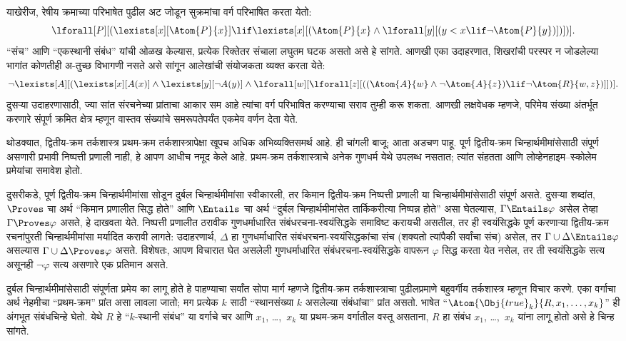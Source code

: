 याखेरीज, रेषीय क्रमाच्या परिभाषेत पुढील अट जोडून सुक्रमांचा वर्ग परिभाषित
करता येतो:
\[\lforall[P][(\lexists[x][\Atom{P}{x}] \lif \lexists[x][(\Atom{P}{x}
    \land \lforall[y][(y < x \lif \lnot \Atom{P}{y})])])].
\]
“संच” आणि “एकस्थानी संबंध” यांची ओळख केल्यास, प्रत्येक रिक्तेतर संचाला
लघुतम घटक असतो असे हे सांगते. आणखी एका उदाहरणात, शिखरांची परस्पर न जोडलेल्या
भागांत कोणतीही अ-तुच्छ विभागणी नसते असे सांगून आलेखांची संयोजकता व्यक्त करता
येते:
\[\lnot \lexists[A][(\lexists[x][A(x)] \land \lexists[y][\lnot A(y)]
  \land \lforall[w][\lforall[z][((\Atom{A}{w} \land \lnot \Atom{A}{z})
      \lif \lnot \Atom{R}{w,z})]])].
\]
दुसऱ्या उदाहरणासाठी, ज्या सांत संरचनेच्या प्रांताचा आकार सम
आहे त्यांचा वर्ग परिभाषित करण्याचा सराव तुम्ही करू शकता. आणखी लक्षवेधक
म्हणजे, परिमेय संख्या अंतर्भूत करणारे संपूर्ण क्रमित क्षेत्र म्हणून वास्तव
संख्यांचे समरूपतेपर्यंत एकमेव वर्णन देता येते.

थोडक्यात, द्वितीय-क्रम तर्कशास्त्र प्रथम-क्रम तर्कशास्त्रापेक्षा खूपच अधिक
अभिव्यक्तिसमर्थ आहे. ही चांगली बाजू; आता अडचण पाहू. पूर्ण द्वितीय-क्रम
चिन्हार्थमीमांसेसाठी संपूर्ण असणारी प्रभावी निष्पत्ती प्रणाली नाही, हे
आपण आधीच नमूद केले आहे. प्रथम-क्रम तर्कशास्त्राचे अनेक गुणधर्म येथे उपलब्ध
नसतात; त्यांत संहतता आणि लोव्हेनहाइम--स्कोलेम प्रमेयांचा समावेश होतो.

दुसरीकडे, पूर्ण द्वितीय-क्रम चिन्हार्थमीमांसा सोडून दुर्बल चिन्हार्थमीमांसा
स्वीकारली, तर किमान द्वितीय-क्रम निष्पत्ती प्रणाली या
चिन्हार्थमीमांसेसाठी संपूर्ण असते. दुसऱ्या शब्दांत, $\Proves$ चा अर्थ
“किमान प्रणालीत सिद्ध होते” आणि $\Entails$ चा अर्थ “दुर्बल
चिन्हार्थमीमांसेत तार्किकरीत्या निष्पन्न होते” असा घेतल्यास, $\Gamma \Entails
\varphi$ असेल तेव्हा $\Gamma \Proves \varphi$ असते, हे दाखवता येते.
निष्पत्ती प्रणालीत ठरावीक गुणधर्माधारित संबंधरचना-स्वयंसिद्धके समाविष्ट
करायची असतील, तर ही स्वयंसिद्धके पूर्ण करणाऱ्या द्वितीय-क्रम रचनांपुरती
चिन्हार्थमीमांसा मर्यादित करावी लागते: उदाहरणार्थ, $\Delta$ हा
गुणधर्माधारित संबंधरचना-स्वयंसिद्धकांचा संच (शक्यतो त्यांपैकी सर्वांचा संच)
असेल, तर $\Gamma \cup \Delta \Entails \varphi$ असल्यास $\Gamma \cup \Delta
\Proves \varphi$ असते. विशेषतः, आपण विचारात घेत असलेली गुणधर्माधारित
संबंधरचना-स्वयंसिद्धके वापरून $\varphi$ सिद्ध करता येत नसेल, तर ती स्वयंसिद्धके
सत्य असूनही $\lnot \varphi$ सत्य असणारे एक प्रतिमान असते.

दुर्बल चिन्हार्थमीमांसेसाठी संपूर्णता प्रमेय का लागू होते हे पाहण्याचा सर्वांत
सोपा मार्ग म्हणजे द्वितीय-क्रम तर्कशास्त्राचा पुढीलप्रमाणे बहुवर्गीय
तर्कशास्त्र म्हणून विचार करणे. एका वर्गाचा अर्थ नेहमीचा “प्रथम-क्रम”
प्रांत असा लावला जातो; मग प्रत्येक $k$ साठी “स्थानसंख्या $k$ असलेल्या
संबंधांचा” प्रांत असतो. भाषेत
“$\Atom{\Obj{true}_k}{R,x_1,\dots,x_k}$” ही अंगभूत संबंधचिन्हे घेतो. येथे
$R$ हे “$k$-स्थानी संबंध” या वर्गाचे चर आणि $x_1$, \dots,~$x_k$ या
प्रथम-क्रम वर्गातील वस्तू असताना, $R$ हा संबंध $x_1$, \dots,~$x_k$ यांना
लागू होतो असे हे चिन्ह सांगते.


